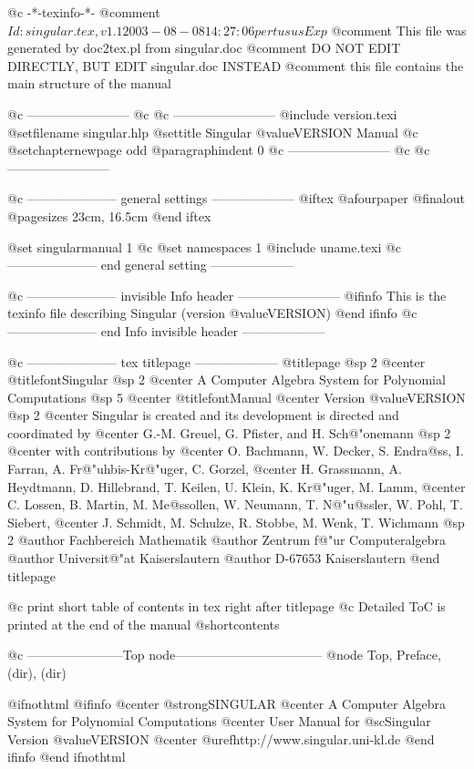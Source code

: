     @c -*-texinfo-*-
@comment $Id: singular.tex,v 1.1 2003-08-08 14:27:06 pertusus Exp $
@comment This file was generated by doc2tex.pl from singular.doc
@comment DO NOT EDIT DIRECTLY, BUT EDIT singular.doc INSTEAD
@comment this file contains the main structure of the manual


@c ------------------------
@c %
@c ------------------------
@include version.texi
@setfilename singular.hlp
@settitle Singular @value{VERSION} Manual
@c @setchapternewpage odd
@paragraphindent 0
@c ------------------------
@c %
@c ------------------------

@c --------------------- general settings --------------------
@iftex
@afourpaper
@finalout
@pagesizes 23cm, 16.5cm
@end iftex

@set singularmanual 1
@c @set namespaces 1
@include uname.texi
@c --------------------- end general setting --------------------


@c --------------------- invisible Info header ------------------------
@ifinfo
This is the texinfo file describing Singular (version @value{VERSION})
@end ifinfo
@c --------------------- end Info invisible header --------------------


@c --------------------- tex titlepage --------------------
@titlepage
@sp 2
@center @titlefont{Singular}
@sp 2
@center A Computer Algebra System for Polynomial Computations
@sp 5
@center @titlefont{Manual}
@center Version @value{VERSION}
@sp 2
@center Singular is created and its development is directed and coordinated by
@center G.-M. Greuel, G. Pfister, and H. Sch@"onemann
@sp 2
@center with contributions by
@center O. Bachmann, W. Decker, S. Endra@ss{}, I. Farran, A. Fr@"uhbis-Kr@"uger, C. Gorzel,
@center H. Grassmann, A. Heydtmann, D. Hillebrand, T. Keilen, U. Klein, K. Kr@"uger, M. Lamm,
@center C. Lossen, B. Martin, M. Me@ss{}ollen, W. Neumann, T. N@"u@ss{}ler, W. Pohl, T. Siebert,
@center J. Schmidt, M. Schulze, R. Stobbe, M. Wenk, T. Wichmann
@sp 2
@author Fachbereich Mathematik
@author Zentrum f@"ur Computeralgebra
@author Universit@"at Kaiserslautern
@author D-67653 Kaiserslautern
@end titlepage

@c print short table of contents in tex right after titlepage
@c Detailed ToC is printed at the end of the manual
@shortcontents

@c -----------------------Top node-----------------------------------
@node Top, Preface, (dir), (dir)

@ifnothtml
@ifinfo
@center @strong{SINGULAR}
@center A Computer Algebra System for Polynomial Computations
@center User Manual for @sc{Singular} Version @value{VERSION}
@center @uref{http://www.singular.uni-kl.de}
@end ifinfo
@end ifnothtml

